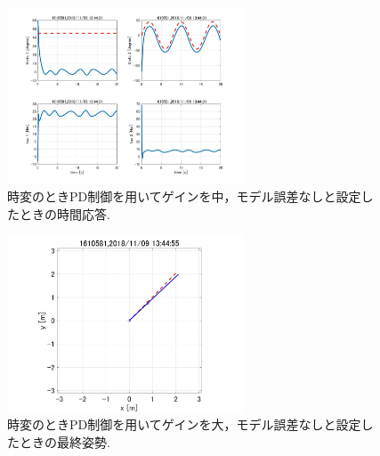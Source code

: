 \documentclass[twocolumn, 10pt,a4j]{jsarticle}
\begin{document}
    \begin{figure}[H]
      \begin{center}
        \includegraphics[width=7cm]{../img/img/kansetu_PD_zihen_chu_no_model_gosa_zikan_auto.jpg}
        \caption{時変のときPD制御を用いてゲインを中，モデル誤差なしと設定したときの時間応答.}
      \end{center}
    \end{figure}
    \begin{figure}[H]
      \begin{center}
        \includegraphics[width=7cm]{../img/img/kansetu_PD_zihen_large_no_model_gosa_saisyu_sisei.jpg}
        \caption{時変のときPD制御を用いてゲインを大，モデル誤差なしと設定したときの最終姿勢.}
      \end{center}
    \end{figure}
\end{document}
